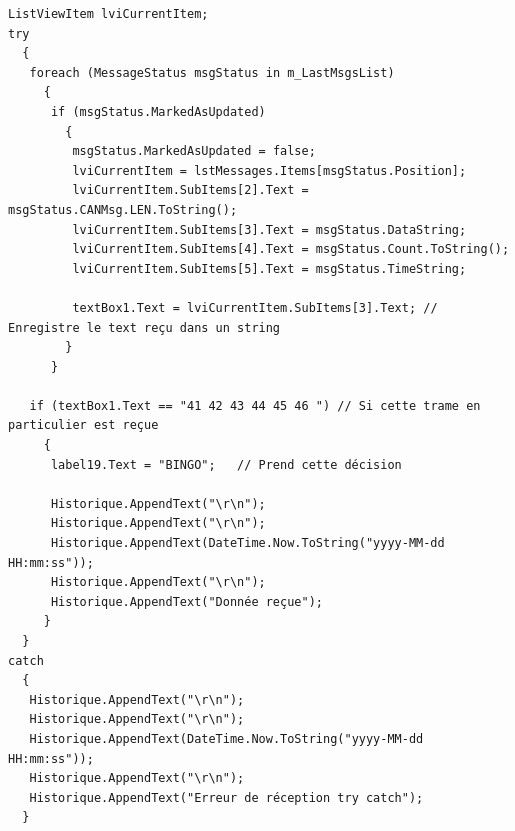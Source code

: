 \documentclass[10pt,a4paper,final]{article}
\begin{document}
\begin{lstlisting}
ListViewItem lviCurrentItem;
try
  {
   foreach (MessageStatus msgStatus in m_LastMsgsList)
     {
      if (msgStatus.MarkedAsUpdated)
        {
         msgStatus.MarkedAsUpdated = false;
         lviCurrentItem = lstMessages.Items[msgStatus.Position];
         lviCurrentItem.SubItems[2].Text = msgStatus.CANMsg.LEN.ToString();
         lviCurrentItem.SubItems[3].Text = msgStatus.DataString;
         lviCurrentItem.SubItems[4].Text = msgStatus.Count.ToString();
         lviCurrentItem.SubItems[5].Text = msgStatus.TimeString;

         textBox1.Text = lviCurrentItem.SubItems[3].Text; // Enregistre le text reçu dans un string
        }
      }

   if (textBox1.Text == "41 42 43 44 45 46 ") // Si cette trame en particulier est reçue
     {
      label19.Text = "BINGO";   // Prend cette décision

      Historique.AppendText("\r\n");
      Historique.AppendText("\r\n");
      Historique.AppendText(DateTime.Now.ToString("yyyy-MM-dd HH:mm:ss"));
      Historique.AppendText("\r\n");
      Historique.AppendText("Donnée reçue"); 
     }
  }
catch
  {
   Historique.AppendText("\r\n");
   Historique.AppendText("\r\n");
   Historique.AppendText(DateTime.Now.ToString("yyyy-MM-dd HH:mm:ss"));
   Historique.AppendText("\r\n");
   Historique.AppendText("Erreur de réception try catch");
  }
\end{lstlisting}
\end{document}
